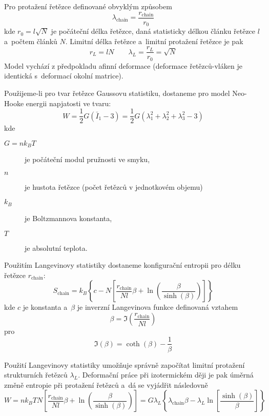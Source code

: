 Pro protažení řetězce definované obvyklým způsobem
\begin{equation}
	\lambda_\text{chain} = \frac{r_\text{chain}}{r_0}
\end{equation}
kde $r_0 = l \sqrt{N}$ je počáteční délka řetězce, daná statisticky délkou článku řetězce $l$ a~počtem článků $N$.
Limitní délka řetězce a~limitní protažení řetězce je pak
\begin{equation}
	r_L = l N
	\qquad
	\lambda_L = \frac{r_L}{r_0} = \sqrt{N}
\end{equation}
Model vychází z předpokladu afinní deformace (deformace řetězců-vláken je identická s~deformací okolní matrice).

Použijeme-li pro tvar řetězce Gaussovu statistiku, dostaneme pro model Neo-Hooke energii napjatosti ve tvaru:
\begin{equation}
	W = \frac{1}{2} G (\bar{I}_1 - 3)
	= \frac{1}{2} G \left(\lambda_1^2 + \lambda_2^2 + \lambda_3^2 - 3\right)
\end{equation}
kde
\begin{description}
	\item[{$G = n k_B T$}] je počáteční modul pružnosti ve smyku,
	\item[$n$] je hustota řetězce (počet řetězců v jednotkovém objemu)
	\item[$k_B$] je Boltzmannova konstanta,
	\item[$T$] je absolutní teplota.
\end{description}

Použitím Langevinovy statistiky dostaneme konfigurační entropii pro délku řetězce $r_\text{chain}$:
\begin{equation}
	S_\text{chain} = k_B \left\{c - N\left[\frac{r_\text{chain}}{N l} \beta + \ln\left(\frac{\beta}{\sinh(\beta)}\right) \right]\right\}
\end{equation}
kde $c$ je konstanta a~$\beta$ je inverzní Langevinova funkce definovaná vztahem
\begin{equation}
	\beta = \Im\left(\frac{r_\text{chain}}{N l}\right)
\end{equation}
pro
\begin{equation}
	\Im(\beta) = \coth(\beta) - \frac{1}{\beta}
\end{equation}

Použití Langevinovy statistiky umožňuje správně započítat limitní protažení strukturních řetězců $\lambda_L$. Deformační práce při izotermickém ději je pak úměrná změně entropie při protažení řetězců a~dá se vyjádřit následovně
\begin{equation}\label{eq:deformacni-prace-izotermickeho-deje}
	W = n k_B T N \left[\frac{r_\text{chain}}{N l} \beta + \ln\left(\frac{\beta}{\sinh(\beta)}\right) \right]
	= G \lambda_L \left\{ \lambda_\text{chain} \beta - \lambda_L \ln\left[ \frac{\sinh(\beta)}{\beta} \right] \right\}
\end{equation}

